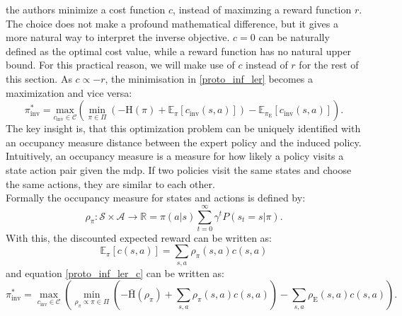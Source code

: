 the authors minimize a cost function $c$, instead of maximzing a reward function $r$. The choice does not make a profound 
mathematical difference, but it gives a more natural way to interpret the inverse objective. $c=0$ can be naturally defined as the optimal cost value, while a reward function has 
no natural upper bound. For this practical reason, we will make use of $c$ instead of $r$ for the rest of this section. As $c \propto -r$, the minimisation in 
\ref{proto_inf_ler} becomes a maximization and vice versa:
\begin{equation}
    \label{proto_inf_ler_c}
    \pi_{\text{inv}}^* = \underset{c_{\text{inv}} \in \mathcal{C}}{\text{max}} \left( \min_{\pi \in \Pi} \left(- \text{H}(\pi) + \mathbb{E}_{\pi}[c_{\text{inv}}(s, a)] \right) - \mathbb{E}_{\pi_{\text{E}}}[c_{\text{inv}}(s,a)] \right).
\end{equation}
The key insight is, that this optimization problem can be uniquely identified with an occupancy measure distance between the expert policy and the 
induced policy. Intuitively, an occupancy measure is a measure for how likely a policy visits a state action pair given the \ac{mdp}. If two policies visit the same 
states and choose the same actions, they are similar to each other.\\
Formally the occupancy measure for states and actions is defined by: 
\begin{equation*}
    \rho_{\pi}:\mathcal{S} \times \mathcal{A} \rightarrow \mathbb{R} = \pi(a|s)\sum_{t=0}^\infty \gamma^tP(s_t=s|\pi).
\end{equation*}
With this, the discounted expected reward can be written as:
\begin{equation}
    \mathbb{E}_\pi[c(s,a)] = \sum_{s,a} \rho_\pi(s,a) c(s,a)
\end{equation}
and equation \ref{proto_inf_ler_c} can be written as:
\begin{equation}
    \label{occ_meas_obj}
    \pi_{\text{inv}}^* = \max_{c_{\text{inv}} \in \mathcal{C}} \left( \min_{\rho_\pi \propto \pi \in \Pi} \left(- \bar{\text{H}}(\rho_\pi) + \sum_{s,a} \rho_\pi(s,a) c(s,a) \right) - \sum_{s,a} \rho_{\text{E}}(s,a) c(s,a) \right).
\end{equation}


